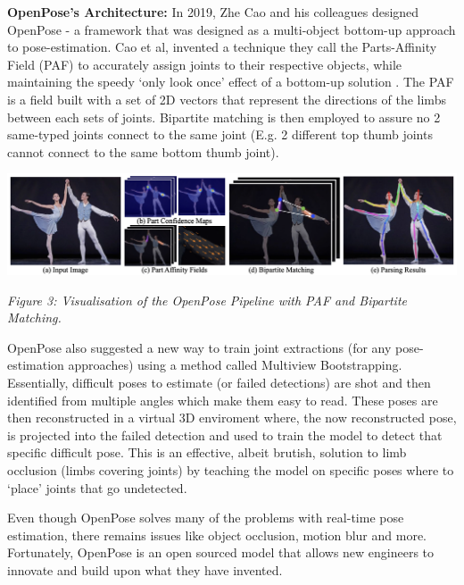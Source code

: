 \documentclass[11pt]{article}
\def\paraskip{\vskip 0.4cm}
\begin{document}
        \paraskip
        \noindent\textbf{OpenPose's Architecture: } In 2019, Zhe Cao and his colleagues designed OpenPose - a framework that was designed as a multi-object bottom-up approach to pose-estimation. Cao et al, invented a technique they call the Parts-Affinity Field (PAF) to accurately assign joints to their respective objects, while maintaining the speedy `only look once' effect of a bottom-up solution \cite{openpose}. The PAF is a field built with a set of 2D vectors that represent the directions of the limbs between each sets of joints. Bipartite matching is then employed to assure no 2 same-typed joints connect to the same joint (E.g. 2 different top thumb joints cannot connect to the same bottom thumb joint).

        \vskip 0.2cm
        \begin{center}
            \includegraphics[width=14cm]{images/openpose.png}
            \\
            \raggedright \textit{
            Figure 3: Visualisation of the OpenPose Pipeline with PAF and Bipartite Matching.
            }
            \cite{openpose}
        \end{center}
        \vskip 0.2cm

        OpenPose also suggested a new way to train joint extractions (for any pose-estimation approaches) using a method called Multiview Bootstrapping. Essentially, difficult poses to estimate (or failed detections) are shot and then identified from multiple angles which make them easy to read. These poses are then reconstructed in a virtual 3D enviroment where, the now reconstructed pose, is projected into the failed detection and used to train the model to detect that specific difficult pose. This is an effective, albeit brutish, solution to limb occlusion (limbs covering joints) by teaching the model on specific poses where to `place' joints that go undetected.

        Even though OpenPose solves many of the problems with real-time pose estimation, there remains issues like object occlusion, motion blur and more. Fortunately, OpenPose is an open sourced model that allows new engineers to innovate and build upon what they have invented.
\end{document}
